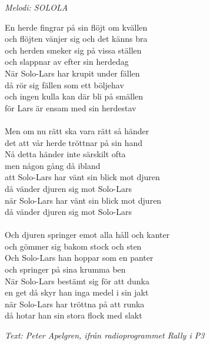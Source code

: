 {\footnotesize\textit{Melodi: SOLOLA}}\par
\vspace{10pt}
En herde fingrar på sin flöjt om kvällen\\
och flöjten vänjer sig och det känns bra\\
och herden smeker sig på vissa ställen\\
och slappnar av efter sin herdedag\\
När Solo-Lars har krupit under fällen\\
då rör sig fällen som ett böljehav\\
och ingen kulla kan där bli på smällen\\
för Lars är ensam med sin herdestav\\
\\
Men om nu rätt ska vara rätt så händer\\
det att vår herde tröttnar på sin hand\\
Nå detta händer inte särskilt ofta\\
men någon gång då ibland \\
att Solo-Lars har vänt sin blick mot djuren\\
då vänder djuren sig mot Solo-Lars \\
när Solo-Lars har vänt sin blick mot djuren\\
då vänder djuren sig mot Solo-Lars\\
\\
Och djuren springer emot alla håll och kanter\\
och gömmer sig bakom stock och sten\\
Och Solo-Lars han hoppar som en panter\\
och springer på sina krumma ben \\
När Solo-Lars bestämt sig för att dunka\\
en get då skyr han inga medel i sin jakt\\
när Solo-Lars har tröttna på att runka\\
då hotar han sin stora flock med slakt
\par
\vspace{10pt}
{\footnotesize\textit{Text: Peter Apelgren, ifrån radioprogrammet Rally i P3}}
